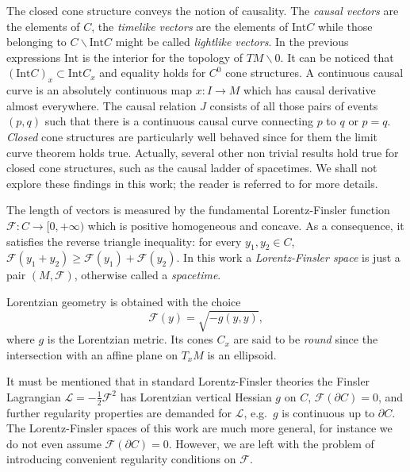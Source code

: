 \documentclass[a4paper]{jpconf}
\theoremstyle{definition}
\theoremstyle{remark}
\newcommand{\p}{\partial}
\begin{document}
The closed cone structure conveys the notion of causality. The {\em causal vectors} are the elements of $C$, the {\em timelike vectors} are the elements of $\textrm{Int} C$ while those belonging to $C\backslash \textrm{Int} C$ might be called {\em lightlike vectors}. In the previous expressions $\textrm{Int}$ is the interior for the topology of $TM\backslash 0$. It can be noticed that $ (\textrm{Int} C)_x \subset \textrm{Int} C_x$ and equality holds for $C^0$ cone structures. A continuous causal curve is an absolutely continuous map $x\colon I \to M$ which has causal derivative almost everywhere. The causal relation $J$ consists of all those pairs of events $(p,q)$ such that there is a continuous causal curve connecting $p$ to $q$ or $p=q$.
{\em Closed} cone structures are particularly well behaved since for them the limit curve theorem holds true. Actually, several other non trivial results hold true for closed cone structures, such as the causal ladder of spacetimes. We shall not explore these findings in this work; the reader is referred to \cite{minguzzi17} for more details.


The length of vectors is measured by the fundamental Lorentz-Finsler function $\mathscr{F}\colon C\to [0,+\infty)$ which is positive homogeneous and concave.
 As a consequence, it satisfies the reverse triangle inequality: for every $y_1,y_2\in C$, $\mathscr{F}(y_1+y_2)\ge \mathscr{F}(y_1)+\mathscr{F}(y_2)$.
 In this work a {\em Lorentz-Finsler space} is just a pair $(M,\mathscr{F})$, otherwise called a {\em spacetime}.

 Lorentzian geometry is obtained with the choice
\begin{equation} \label{nia}
\mathscr{F}(y)=\sqrt{-g(y,y)} ,
\end{equation}
where $g$ is the Lorentzian metric. Its cones $C_x$ are said to be {\em round} since the intersection with an affine plane on $T_xM$ is an ellipsoid.

It must be mentioned that in standard Lorentz-Finsler theories the Finsler Lagrangian $\mathscr{L}=-\frac{1}{2}\mathscr{F}^2$ has Lorentzian vertical Hessian $g$ on $C$, $\mathscr{F}(\p C)=0$, and further regularity properties are demanded for $\mathscr{L}$, e.g.\ $g$ is continuous up to $\p C$. The Lorentz-Finsler spaces of this work are much more general, for instance we do not even assume $\mathscr{F}(\p C)=0$. However, we are left with the problem of introducing convenient regularity conditions on $\mathscr{F}$.
\end{document}
